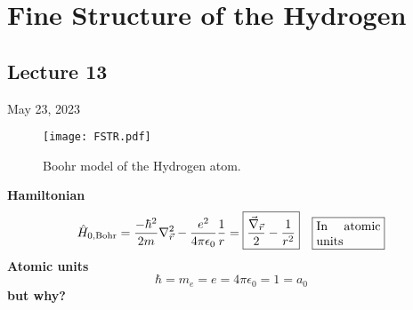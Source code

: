 \documentclass[12pt,fancychapters]{report}
\numberwithin{equation}{section}
\begin{document}
\chapter{Fine Structure of the Hydrogen}
\section{Lecture 13}
May 23, 2023\\
\begin{wrapfigure}{l}{6cm}
  \begin{center}
\texttt{[image: FSTR.pdf]}
\caption{Boohr model of the Hydrogen atom.}
  \end{center}
\end{wrapfigure}
\textbf{Hamiltonian}
\[
  \hat{H}_{0,\text{Bohr}} = \frac{-\hbar^2}{2m}\nabla^2_{\vec{r}}
  - \frac{e^2}{4\pi\epsilon_0}\frac{1}{r}=
  \boxed{\frac{\vec{\nabla}_{\vec{r}}}{2} - \frac{1}{r^2}}\quad
  \fbox{%
  \parbox{.15\textwidth}{%
  In atomic units}%
} 
\]
\textbf{Atomic units}
\[
  \hbar = m_e = e = 4\pi \epsilon_0 = 1 = a_0
\]
\textbf{but why?}
\end{document}
